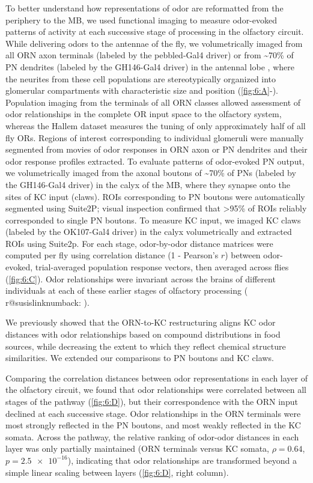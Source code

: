 \documentclass[12pt]{caltech_thesis}
\makeatletter
\renewcommand{\cite}{{ }\autocite}
\newcounter{susis}
\newcommand{\hypertargetd}[2]{%
  {\refstepcounter{susis}\label{susistarget#1}}%
  \ifcsname r@susislink#1\endcsname
  \hypertarget{#1}{#2}%
  \else
  \fbox{\textcolor{red}{#2}}%
  \fi
  }%
\newcommand{\hypertargetd}{\hypertarget}
\newcommand*\my@refwithbackref[2]{%
  \edef\my@brlabel{\my@br@parent{#2}}%
  \expandafter\my@br@explicitcall\expandafter{\my@brlabel}%
  \hypertargetd{numback:\my@brlabel}{#1{#2}}%
}
\newcommand*\crefwithbackref{\my@refwithbackref\my@origcref}
\makeatother
\begin{document}
\begin{refsection}
To better understand how representations of odor are reformatted from the periphery to the MB, we used functional imaging to measure odor-evoked patterns of activity at each successive stage of processing in the olfactory circuit.
While delivering odors to the antennae of the fly, we volumetrically imaged from all ORN axon terminals (labeled by the pebbled-Gal4 driver) or from \textasciitilde70\% of PN dendrites (labeled by the GH146-Gal4 driver) in the antennal lobe\cite{Zocchi2022}, where the neurites from these cell populations are stereotypically organized into glomerular compartments with characteristic size and position (\cref{fig:6:A}-).
Population imaging from the terminals of all ORN classes allowed assessment of odor relationships in the complete OR input space to the olfactory system, whereas the Hallem dataset measures the tuning of only approximately half of all fly ORs. %
Regions of interest corresponding to individual glomeruli were manually segmented from movies of odor responses in ORN axon or PN dendrites and their odor response profiles extracted.
To evaluate patterns of odor-evoked PN output, we volumetrically imaged from the axonal boutons of \textasciitilde70\% of PNs (labeled by the GH146-Gal4 driver) in the calyx of the MB, where they synapse onto the sites of KC input (claws).
ROIs corresponding to PN boutons were automatically segmented using Suite2P; visual inspection confirmed that >95\% of ROIs reliably corresponded to single PN boutons.
To measure KC input, we imaged KC claws (labeled by the OK107-Gal4 driver) in the calyx volumetrically and extracted ROIs using Suite2p.
For each stage, odor-by-odor distance matrices were computed per fly using correlation distance (1 - Pearson's $r$) between odor-evoked, trial-averaged population response vectors, then averaged across flies (\cref{fig:6:C}).
Odor relationships were invariant across the brains of different individuals at each of these earlier stages of olfactory processing (\crefwithbackref{fig:s6:A}).

We previously showed that the ORN-to-KC restructuring aligns KC odor distances with odor relationships based on compound distributions in food sources, while decreasing the extent to which they reflect chemical structure similarities.
We extended our comparisons to PN boutons and KC claws.

Comparing the correlation distances between odor representations in each layer of the olfactory circuit, we found that odor relationships were correlated between all stages of the pathway (\cref{fig:6:D}), but their correspondence with the ORN input declined at each successive stage.
Odor relationships in the ORN terminals were most strongly reflected in the PN boutons, and most weakly reflected in the KC somata.
Across the pathway, the relative ranking of odor-odor distances in each layer was only partially maintained (ORN terminals versus KC somata, $\rho {=} 0.64$, $p{=}\num{2.5e-16}$), indicating that odor relationships are transformed beyond a simple linear scaling between layers (\cref{fig:6:D}, right column). 


\end{refsection}
\end{document}
